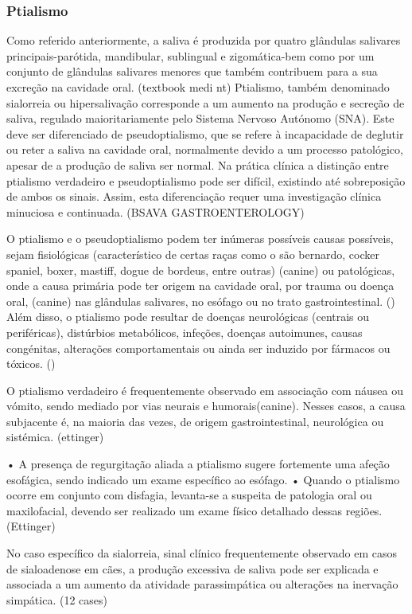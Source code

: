 \subsubsection{Ptialismo} 

Como referido anteriormente, a saliva é produzida por quatro glândulas salivares principais-parótida, mandibular, sublingual e zigomática-bem como por um conjunto de glândulas salivares menores que também contribuem para a sua excreção na cavidade oral. (textbook medi nt)
Ptialismo, também denominado sialorreia ou hipersalivação corresponde a um aumento na produção e secreção de saliva, regulado maioritariamente pelo Sistema Nervoso Autónomo (SNA). Este deve ser diferenciado de pseudoptialismo, que se refere à incapacidade de deglutir ou reter a saliva na cavidade oral, normalmente devido a um processo patológico, apesar de a produção de saliva ser normal.
 Na prática clínica a distinção entre ptialismo verdadeiro e pseudoptialismo pode ser difícil, existindo até sobreposição de ambos os sinais. Assim, esta diferenciação requer uma investigação clínica minuciosa e continuada. (BSAVA GASTROENTEROLOGY)


O ptialismo e o pseudoptialismo podem ter inúmeras possíveis causas possíveis, sejam fisiológicas (característico de certas raças como o são bernardo, cocker spaniel, boxer, mastiff, dogue de bordeus, entre outras) (canine) ou patológicas, onde a causa primária pode ter origem na cavidade oral, por trauma ou doença oral, (canine) nas glândulas salivares, no esófago ou no trato gastrointestinal. (\cite{Kook2013}) Além disso, o ptialismo pode resultar de doenças neurológicas (centrais ou periféricas), distúrbios metabólicos, infeções, doenças autoimunes, causas congénitas, alterações comportamentais ou ainda ser induzido por fármacos ou tóxicos. (\cite{Kook2013}) 


O ptialismo verdadeiro é frequentemente observado em associação com náusea ou vómito, sendo mediado por vias neurais e humorais(canine). Nesses casos, a causa subjacente é, na maioria das vezes, de origem gastrointestinal, neurológica ou sistémica. (ettinger)


•	A presença de regurgitação aliada a ptialismo sugere fortemente uma afeção esofágica, sendo indicado um exame específico ao esófago.
•	Quando o ptialismo ocorre em conjunto com disfagia, levanta-se a suspeita de patologia oral ou maxilofacial, devendo ser realizado um exame físico detalhado dessas regiões. (Ettinger)


No caso específico da sialorreia, sinal clínico frequentemente observado em casos de sialoadenose em cães, a produção excessiva de saliva pode ser explicada e associada a um aumento da atividade parassimpática ou alterações na inervação simpática. (12 cases) 


